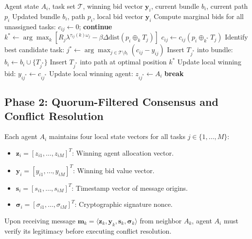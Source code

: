 \documentclass[journal,10pt,twocolumn]{IEEEtran}
\begin{document}
\begin{algorithm}[t]
\caption{BFT-CBBA Phase 1: Local Bundle Construction}
\label{alg:bundle_construction}
\begin{algorithmic}[1]
\Require Agent state $A_i$, task set $\mathcal{T}$, winning bid vector $\mathbf{y}_i$, current bundle $b_i$, current path $p_i$
\Ensure Updated bundle $b_i$, path $p_i$, local bid vector $\mathbf{y}_i$
    \State Compute marginal bids for all unassigned tasks:
            \State $c_{ij} \gets 0$; \textbf{continue}
        \EndIf
        \State $k^* \gets \arg\max_{k} \left[ R_j \lambda^{\tau_{ij}(k)\omega_j} - \beta \Delta \text{dist}(p_i \oplus_k T_j) \right]$
        \State $c_{ij} \gets c_{ij}(p_i \oplus_{k^*} T_j)$
    \EndFor
    \State Identify best candidate task:
    \State $j^* \gets \arg\max_{j \in \mathcal{T} \setminus b_i} (c_{ij} - y_{ij})$
        \State Insert $T_{j^*}$ into bundle: $b_i \gets b_i \cup \{T_{j^*}\}$
        \State Insert $T_{j^*}$ into path at optimal position $k^*$
        \State Update local winning bid: $y_{i j^*} \gets c_{i j^*}$
        \State Update local winning agent: $z_{i j^*} \gets A_i$
    \Else
        \State \textbf{break} 
    \EndIf
\EndWhile
\end{algorithmic}
\end{algorithm}

\subsection{Phase 2: Quorum-Filtered Consensus and Conflict Resolution}
Each agent $A_i$ maintains four local state vectors for all tasks $j \in \{1, \dots, M\}$:
\begin{itemize}
    \item $\mathbf{z}_i = [z_{i1}, \dots, z_{iM}]^T$: Winning agent allocation vector.
    \item $\mathbf{y}_i = [y_{i1}, \dots, y_{iM}]^T$: Winning bid value vector.
    \item $\mathbf{s}_i = [s_{i1}, \dots, s_{iM}]^T$: Timestamp vector of message origins.
    \item $\mathbf{\sigma}_i = [\sigma_{i1}, \dots, \sigma_{iM}]^T$: Cryptographic signature nonce.
\end{itemize}

Upon receiving message $\mathbf{m}_k = \langle \mathbf{z}_k, \mathbf{y}_k, \mathbf{s}_k, \mathbf{\sigma}_k \rangle$ from neighbor $A_k$, agent $A_i$ must verify its legitimacy before executing conflict resolution.
\end{document}

